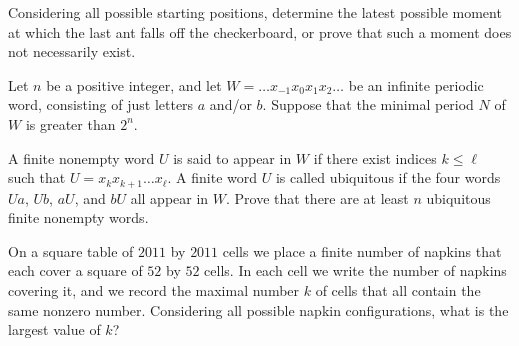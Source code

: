Considering all possible starting positions, determine the latest possible moment at which the last ant falls off the checkerboard, or prove that such a moment does not necessarily exist.

\item[\textbf{C6.}]
Let 
$n$
 be a positive integer, and let 
$W = \ldots x_{-1}x_0x_1x_2 \ldots$
 be an infinite periodic word, consisting of just letters 
$a$
 and/or 
$b$.
 Suppose that the minimal period 
$N$
 of 
$W$
 is greater than 
$2^n$.


A finite nonempty word 
$U$
 is said to 
appear
 in 
$W$
 if there exist indices 
$k \leq \ell$
 such that 
$U=x_k x_{k+1} \ldots x_{\ell}$.
 A finite word 
$U$
 is called 
ubiquitous
 if the four words 
$Ua$, 
$Ub$, 
$aU$, 
 and 
$bU$
 all appear in 
$W$.
 Prove that there are at least 
$n$
 ubiquitous finite nonempty words.

\item[\textbf{C7.}]
On a square table of 
$2011$
 by 
$2011$
 cells we place a finite number of napkins that each cover a square of 
$52$
 by 
$52$
 cells. In each cell we write the number of napkins covering it, and we record the maximal number 
$k$
 of cells that all contain the same nonzero number. Considering all possible napkin configurations, what is the largest value of 
$k$?